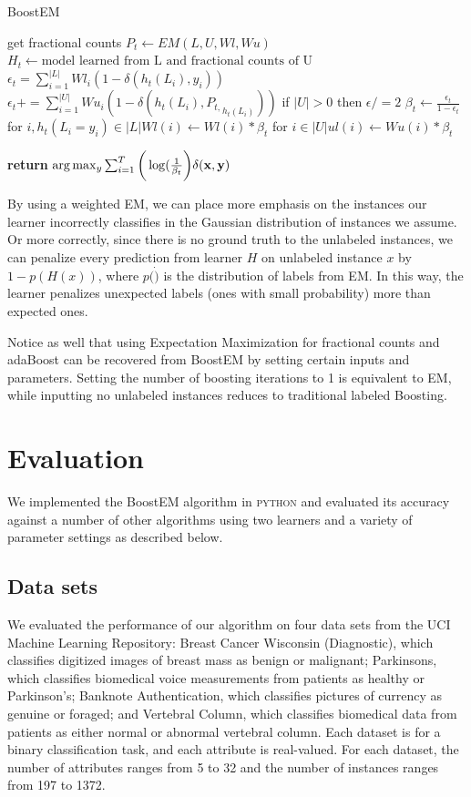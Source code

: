 \documentclass{sig-alternate}
\begin{document}
\begin{algorithm}
\caption{BoostEM}\label{euclid}
\begin{algorithmic}[1]
\State get fractional counts $P_{t} \gets EM(L,U,Wl,Wu)$
\State $H_{t} \gets \text{model learned from L and fractional counts of U}$
\State $\epsilon_{t} = \sum_{i=1}^{|L|} Wl_{i}(1-\delta(h_{t}(L_{i}),y_{i}))$
\State $\epsilon_{t} += \sum_{i=1}^{|U|} Wu_{i}(1-\delta(h_{t}(L_{i}),{P_{t,}}_{h_{t}(L_{i})}))$
\State if $|U| > 0$ then $\epsilon /=2$
\State $\beta_{t} \gets \frac{\epsilon_{t}}{1-\epsilon_{t}}$
\State for $i,h_{t}(L_{i} = y_{i}) \in |L| Wl(i) \gets Wl(i)*\beta_{t}$
\State for $i \in |U| ul(i) \gets Wu(i)*\beta_{t}$

\EndFor
\State \textbf{return} $\arg \max_{y} \sum_{i=1}^{T}\bigg(\log(\frac{1}{\beta_{t}}\bigg) \delta(\bf{x},y)$
\EndProcedure
\end{algorithmic}
\end{algorithm}

By using a weighted EM, we can place more emphasis on the instances our learner incorrectly classifies in the Gaussian distribution of instances we assume. Or more correctly, since there is no ground truth to the unlabeled instances, we can penalize every prediction from learner $H$ on unlabeled instance $x$ by $1-p(H(x))$, where $p(\dot)$ is the distribution of labels from EM.  In this way, the learner penalizes unexpected labels (ones with small probability) more than expected ones.

Notice as well that using Expectation Maximization for fractional counts and adaBoost can be recovered from BoostEM by setting certain inputs and parameters.  Setting the number of boosting iterations to 1 is equivalent to EM, while inputting no unlabeled instances reduces to traditional labeled Boosting.    
    
\section{Evaluation}
We implemented the BoostEM algorithm in \textsc{python} and evaluated its accuracy against a number of other algorithms using two learners and a variety of parameter settings  as described below.

\subsection{Data sets}

We evaluated the performance of our algorithm on four data sets from the UCI Machine Learning Repository: Breast Cancer Wisconsin (Diagnostic), which classifies digitized images of breast mass as benign or malignant; Parkinsons, which classifies biomedical voice measurements from patients as healthy or Parkinson's; Banknote Authentication, which classifies pictures of currency as genuine or foraged; and Vertebral Column, which classifies biomedical data from patients as either normal or abnormal vertebral column. Each dataset is for a binary classification task, and each attribute is real-valued. For each dataset, the number of attributes ranges from 5 to 32 and the number of instances ranges from 197 to 1372. 
\end{document}

